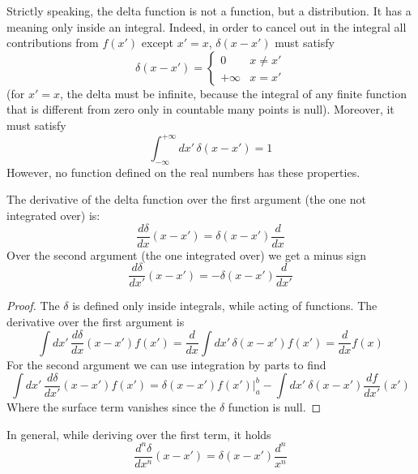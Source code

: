 \documentclass[11pt,fleqn]{book} %
\begin{document}
\begin{remark}
    Strictly speaking, the delta function is not a function, but a distribution. It has a meaning only inside an integral. Indeed, 
    in order to cancel out in the integral all contributions from $f(x')$ except $x'=x$, $\delta(x-x')$ must satisfy
    \begin{equation*}
        \delta(x-x') = \left\{\begin{array}{cc}
            0 & x\neq x' \\
           +\infty & x=x'
        \end{array}\right.
    \end{equation*}
    (for $x'=x$, the delta must be infinite, because the integral of any finite function that is different from zero only in countable many points is null).
    Moreover, it must satisfy
    \begin{equation*}
        \int_{-\infty}^{+\infty}\!dx'\,\delta(x-x') = 1
    \end{equation*}
    However, no function defined on the real numbers has these properties.
\end{remark}

\begin{theorem}
    The derivative of the delta function over the first argument (the one not integrated over) is:
    \begin{equation*}
        \frac{d\delta}{dx}(x-x') = \delta(x-x')\frac{d}{dx}
    \end{equation*}
    Over the second argument (the one integrated over) we get a minus sign
    \begin{equation*}
        \frac{d\delta}{dx'}(x-x') = -\delta(x-x')\frac{d}{dx'}
    \end{equation*}
\end{theorem}
\begin{proof}
    The $\delta$ is defined only inside integrals, while acting of functions. The derivative over the first argument is
    \begin{equation*}
        \int\!dx'\,\frac{d\delta}{dx}(x-x')f(x') = \frac{d}{dx}\int\!dx'\,\delta(x-x')f(x') = \frac{d}{dx}f(x)
    \end{equation*}
    For the second argument we can use integration by parts to find
    \begin{equation*}
        \int\!dx'\,\frac{d\delta}{dx'}(x-x')f(x') =  \delta(x-x')f(x')\vert_a^b - \int\!dx'\ \delta(x-x')\frac{df}{dx'}(x')
    \end{equation*}
    Where the surface term vanishes since the $\delta$ function is null.
\end{proof}
In general, while deriving over the first term, it holds
\begin{equation*}
    \frac{d^n\delta}{dx^n}(x-x') =\delta(x-x')\frac{d^n}{x^n}
\end{equation*}
\end{document}
